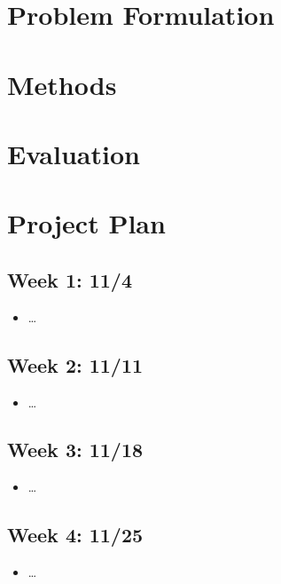 \documentclass[english]{article}
\begin{document}
\section{Problem Formulation}

\section{Methods}

\section{Evaluation}

\section{Project Plan}
\subsection*{Week 1: 11/4}

\begin{itemize}
    \item \ldots
\end{itemize}

\subsection*{Week 2: 11/11}

\begin{itemize}
    \item \ldots
\end{itemize}

\subsection*{Week 3: 11/18}

\begin{itemize}
    \item \ldots
\end{itemize}

\subsection*{Week 4: 11/25}

\begin{itemize}
    \item \ldots
\end{itemize}
\end{document}
